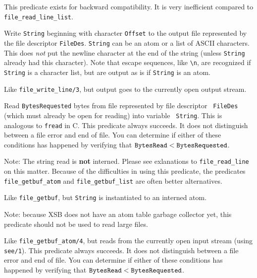 \begin{description}
    This predicate exists for backward compatibility. It is very
    inefficient compared to \verb|file_read_line_list|.

   Write {\tt String} beginning with character {\tt Offset}  to the output
   file represented by the file descriptor {\tt FileDes}. {\tt String} can
   be an atom or a list of ASCII characters. This does \emph{not} put the
   newline character at the end of the string (unless {\tt String} already
   had this character). Note that escape sequences, like \verb|\n|, are
   recognized if {\tt String} is a character list, but are output as is if
   {\tt String} is an atom.
   
   Like \verb|file_write_line/3|, but output goes to the currently open
   output stream.


Read {\tt BytesRequested} bytes from file represented by file descriptor {\tt
  FileDes} (which must already be open for reading) into variable {\tt
  String}. This is analogous to {\tt fread} in C.  This predicate always
succeeds. It does not distinguish between a file error and end of file.
You can determine if either of these conditions has happened by verifying
that $\tt BytesRead < BytesRequested$.

Note: The string read is {\bf not} interned. Please see exlanations to
\verb|file_read_line| on this matter. Because of the difficulties in using
this predicate, the predicates \verb|file_getbuf_atom| and
\verb|file_getbuf_list| are often better alternatives.

Like \verb|file_getbuf|, but {\tt String} is instantiated to an interned atom.

Note: because XSB does not have an atom table garbage collector yet, this
predicate should not be used to read large files.

Like \verb|file_getbuf_atom/4|, but reads from the currently open input stream
(using {\tt see/1}). This predicate always
succeeds. It does not distinguish between a file error and end of file.
You can determine if either of these conditions has happened by verifying
that $\tt BytesRead < BytesRequested$.


\end{description}
